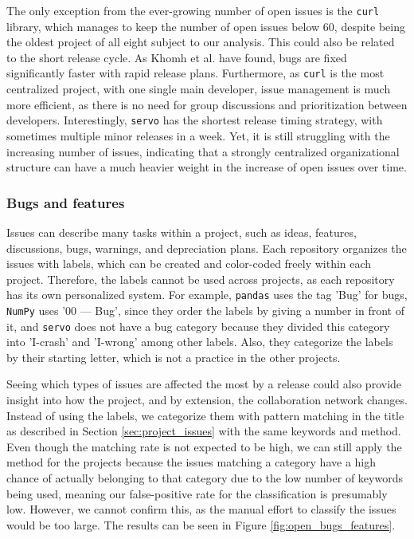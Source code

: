 The only exception from the ever-growing number of open issues is the \texttt{curl} library, which manages to keep the number of open issues below 60, despite being the oldest project of all eight subject to our analysis. This could also be related to the short release cycle. As Khomh et al. \cite{khomhFasterReleasesImprove2012} have found, bugs are fixed significantly faster with rapid release plans. Furthermore, as \texttt{curl} is the most centralized project, with one single main developer, issue management is much more efficient, as there is no need for group discussions and prioritization between developers. Interestingly, \texttt{servo} has the shortest release timing strategy, with sometimes multiple minor releases in a week. Yet, it is still struggling with the increasing number of issues, indicating that a strongly centralized organizational structure can have a much heavier weight in the increase of open issues over time.

\subsubsection{Bugs and features}
\label{sec:bugs-features}
Issues can describe many tasks within a project, such as ideas, features, discussions, bugs, warnings, and depreciation plans. Each repository organizes the issues with labels, which can be created and color-coded freely within each project. Therefore, the labels cannot be used across projects, as each repository has its own personalized system. For example, \texttt{pandas} uses the tag 'Bug' for bugs, \texttt{NumPy} uses '00 — Bug', since they order the labels by giving a number in front of it, and \texttt{servo} does not have a bug category because they divided this category into 'I-crash' and 'I-wrong' among other labels. Also, they categorize the labels by their starting letter, which is not a practice in the other projects.

Seeing which types of issues are affected the most by a release could also provide insight into how the project, and by extension, the collaboration network changes. Instead of using the labels, we categorize them with pattern matching in the title as described in Section \ref{sec:project_issues} with the same keywords and method. Even though the matching rate is not expected to be high, we can still apply the method for the projects because the issues matching a category have a high chance of actually belonging to that category due to the low number of keywords being used, meaning our false-positive rate for the classification is presumably low. However, we cannot confirm this, as the manual effort to classify the issues would be too large. The results can be seen in Figure \ref{fig:open_bugs_features}.

